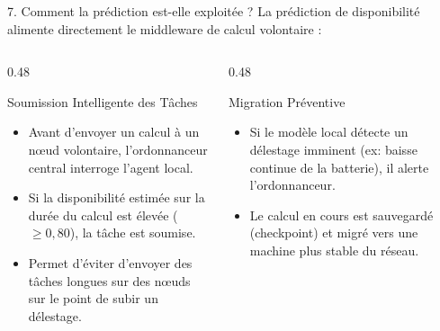 \documentclass[10pt,aspectratio=169]{beamer}
\begin{document}
\begin{frame}{7. Comment la prédiction est-elle exploitée ?}
  La prédiction de disponibilité alimente directement le middleware de calcul volontaire :
  
  \vspace{0.5em}
  \begin{columns}[T]
    \begin{column}{0.48\textwidth}
      \begin{block}{Soumission Intelligente des Tâches}
        \begin{itemize}
          \item Avant d'envoyer un calcul à un nœud volontaire, l'ordonnanceur central interroge l'agent local.
          \item Si la disponibilité estimée sur la durée du calcul est élevée ($\ge 0,80$), la tâche est soumise.
          \item Permet d'éviter d'envoyer des tâches longues sur des nœuds sur le point de subir un délestage.
        \end{itemize}
      \end{block}
    \end{column}
    
    \begin{column}{0.48\textwidth}
      \begin{block}{Migration Préventive}
        \begin{itemize}
          \item Si le modèle local détecte un délestage imminent (ex: baisse continue de la batterie), il alerte l'ordonnanceur.
          \item Le calcul en cours est sauvegardé (checkpoint) et migré vers une machine plus stable du réseau.
        \end{itemize}
      \end{block}
    \end{column}
  \end{columns}
\end{frame}
\end{document}
